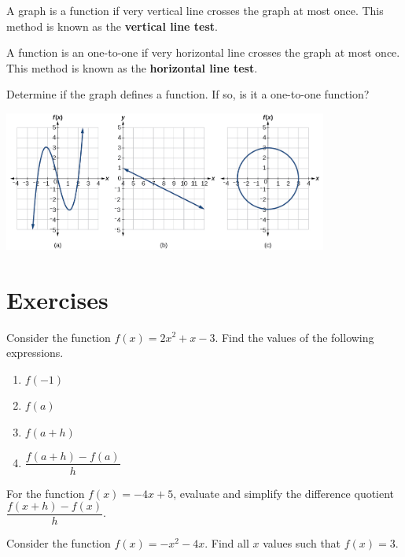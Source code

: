 A graph is a function if very vertical line crosses the graph at most once. This method is known as the \textbf{vertical line test}.

A function is an one-to-one if very horizontal line crosses the graph at most once. This method is known as the \textbf{horizontal line test}.

\begin{example}
  Determine if the graph defines a function. If so, is it a one-to-one function?
  \begin{center}
  \includegraphics[width=0.8\textwidth]{figs/cubic-line-circle.jpg}
  \end{center}
\end{example}

\newpage
\section*{Exercises}

\begin{exercise}
  Consider the function $f(x)=2x^2+x-3$. Find the values of the following expressions.

\begin{enumerate}[fourcol]
  \item \(f(-1)\)
  \item \(f(a)\)
  \item \(f(a+h)\)
  \item \(\dfrac{f(a+h)-f(a)}{h}\)
\end{enumerate}
\end{exercise}
\vspace*{2\baselineskip}

\begin{exercise}
  For the function $f(x)=-4x+5$, evaluate and simplify the difference quotient $\dfrac{f(x+h)-f(x)}{h}$.
\end{exercise}
\vspace*{2\baselineskip}

\begin{exercise}
  Consider the function $f(x)=-x^2-4x$. Find all $x$ values such that $f(x)=3$.
\end{exercise}

